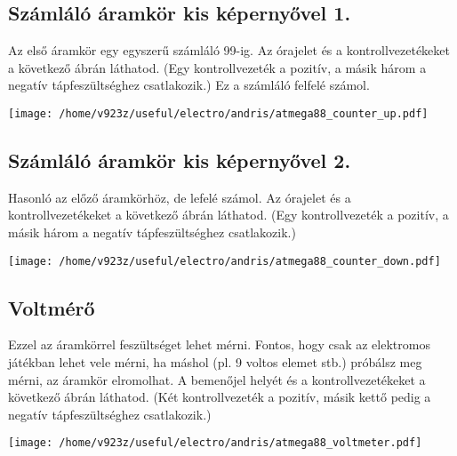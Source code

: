 \documentclass[16pt]{scrreprt}
\begin{document}
\subsection{Számláló áramkör kis képernyővel 1.}

Az első áramkör egy egyszerű számláló 99-ig. Az órajelet és a kontrollvezetékeket a következő ábrán láthatod. (Egy 
kontrollvezeték a pozitív, a másik három a negatív tápfeszültséghez csatlakozik.) Ez a számláló felfelé számol. 

\texttt{[image: /home/v923z/useful/electro/andris/atmega88\_counter\_up.pdf]}

\subsection{Számláló áramkör kis képernyővel 2.}

Hasonló az előző áramkörhöz, de lefelé számol. Az órajelet és a kontrollvezetékeket a következő ábrán láthatod. 
(Egy kontrollvezeték a pozitív, a másik három a negatív tápfeszültséghez csatlakozik.)

\texttt{[image: /home/v923z/useful/electro/andris/atmega88\_counter\_down.pdf]}

\subsection{Voltmérő}

Ezzel az áramkörrel feszültséget lehet mérni. Fontos, hogy csak az elektromos játékban lehet vele mérni, ha máshol (pl. 
9 voltos elemet stb.) próbálsz meg mérni, az áramkör elromolhat. A bemenőjel helyét és a kontrollvezetékeket a 
következő ábrán láthatod. (Két kontrollvezeték a pozitív, másik kettő pedig a negatív tápfeszültséghez csatlakozik.)

\texttt{[image: /home/v923z/useful/electro/andris/atmega88\_voltmeter.pdf]}
\end{document}
